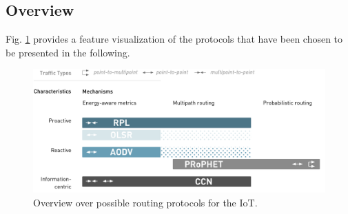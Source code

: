 \subsection{Overview}
\label{subsec:overview}
Fig. \ref{fig:overview} provides a feature visualization of the protocols that have been chosen to be presented in the following.

\begin{figure}[ht!]
  \centering
    \includegraphics[width=\textwidth]{graphics/overview.pdf}
  \caption{Overview over possible routing protocols for the IoT.}
  \label{fig:overview}
\end{figure}

